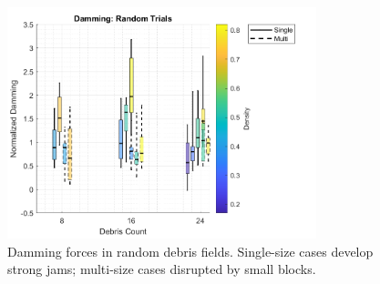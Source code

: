\documentclass{article}
\begin{document}
\begin{figure}[htbp]
    \centering
    \includegraphics[width=0.8\textwidth]{Damming_Random_Single_vs_Multi_ByDensityGradient.png}
    \caption{Damming forces in random debris fields. Single-size cases develop strong jams; multi-size cases disrupted by small blocks.}
    \label{fig:damming_random}
\end{figure}
\end{document}
